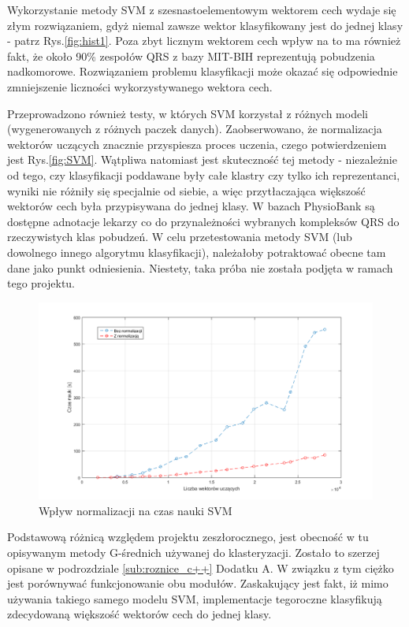 Wykorzystanie metody SVM z szesnastoelementowym wektorem cech wydaje się złym rozwiązaniem, gdyż niemal zawsze wektor klasyfikowany jest do jednej klasy - patrz Rys.\ref{fig:hist1}. Poza zbyt licznym wektorem cech wpływ na to ma również fakt, że około 90\% zespołów QRS z bazy MIT-BIH reprezentują pobudzenia nadkomorowe. Rozwiązaniem problemu klasyfikacji może okazać się odpowiednie zmniejszenie liczności wykorzystywanego wektora cech.

Przeprowadzono również testy, w których SVM korzystał z różnych modeli (wygenerowanych z różnych paczek danych). Zaobserwowano, że normalizacja wektorów uczących znacznie przyspiesza proces uczenia, czego potwierdzeniem jest Rys.\ref{fig:SVM}. Wątpliwa natomiast jest skuteczność tej metody - niezależnie od tego, czy klasyfikacji poddawane były całe klastry czy tylko ich reprezentanci, wyniki nie różniły się specjalnie od siebie, a więc przytłaczająca większość wektorów cech była przypisywana do jednej klasy. W bazach PhysioBank są dostępne adnotacje lekarzy co do przynależności wybranych kompleksów QRS do rzeczywistych klas pobudzeń. W celu przetestowania metody SVM (lub dowolnego innego algorytmu klasyfikacji), należałoby potraktować obecne tam dane jako punkt odniesienia. Niestety, taka próba nie została podjęta w ramach tego projektu. 

\begin{figure}[!htp]
	\centering
	\includegraphics[width=15cm]{Grafika/SVMTrain}
	\caption{Wpływ normalizacji na czas nauki SVM}
	\label{fig:TrainNormSVM}
\end{figure}

Podstawową różnicą względem projektu zeszłorocznego, jest obecność w tu opisywanym metody G-średnich używanej do klasteryzacji. Zostało to szerzej opisane w podrozdziale \ref{sub:roznice_c++} Dodatku A. W związku z tym ciężko jest porównywać funkcjonowanie obu modułów. Zaskakujący jest fakt, iż mimo używania takiego samego modelu SVM, implementacje tegoroczne klasyfikują zdecydowaną większość wektorów cech do jednej klasy.
